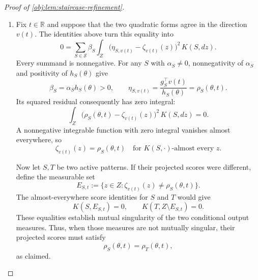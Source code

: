 \begin{proof}[Proof of \cref{obj:lem:staircase-refinement}]
\begin{enumerate}
\item
Fix \(t\in\mathbb R\) and suppose that the two quadratic forms agree in the direction \(v(t)\). The identities above turn this equality into
\[
0=
\sum_{S\in\mathcal S}\beta_S
\int_Z
\bigl(\eta_{S,v(t)}-\zeta_{v(t)}(z)\bigr)^2\,K(S,dz).
\]
Every summand is nonnegative. For any \(S\) with \(\alpha_S\ne0\), nonnegativity of \(\alpha_S\) and positivity of \(h_S(\theta)\) give
\[
\beta_S=\alpha_S h_S(\theta)>0,
\qquad
\eta_{S,v(t)}
=\frac{g_S^\top v(t)}{h_S(\theta)}
=\rho_S(\theta,t).
\]
Its squared residual consequently has zero integral:
\[
\int_Z
\bigl(\rho_S(\theta,t)-\zeta_{v(t)}(z)\bigr)^2\,K(S,dz)=0.
\]
A nonnegative integrable function with zero integral vanishes almost everywhere, so
\[
\zeta_{v(t)}(z)=\rho_S(\theta,t)
\quad\text{for \(K(S,\cdot)\)-almost every \(z\)}.
\]

Now let \(S,T\) be two active patterns. If their projected scores were different, define the measurable set
\[
E_{S,t}:=\{z\in Z:\zeta_{v(t)}(z)\ne\rho_S(\theta,t)\}.
\]
The almost-everywhere score identities for \(S\) and \(T\) would give
\[
K(S,E_{S,t})=0,
\qquad
K(T,Z\setminus E_{S,t})=0.
\]
These equalities establish mutual singularity of the two conditional output measures. Thus, when those measures are not mutually singular, their projected scores must satisfy
\[
\rho_S(\theta,t)=\rho_T(\theta,t),
\]
as claimed.

\end{enumerate}
\end{proof}
